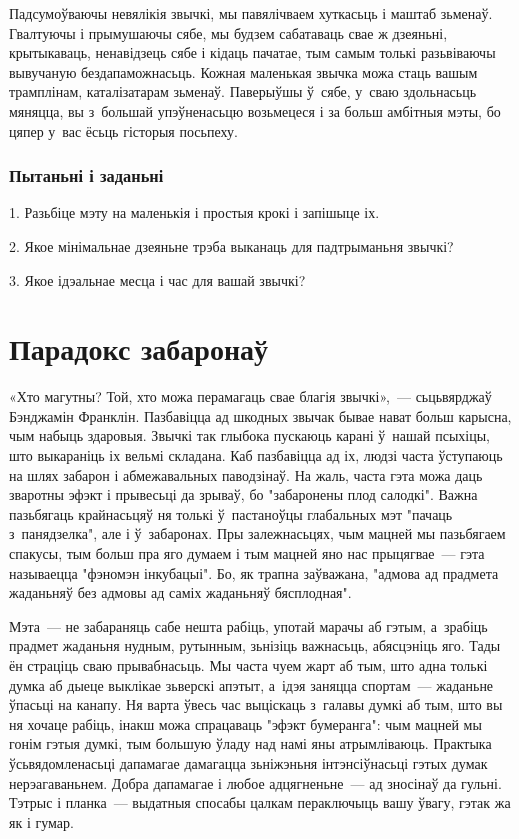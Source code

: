 Падсумоўваючы невялікія звычкі, мы павялічваем хуткасьць і маштаб зьменаў. Гвалтуючы і прымушаючы сябе, мы будзем сабатаваць свае ж дзеяньні, крытыкаваць, ненавідзець сябе і кідаць пачатае, тым самым толькі разьвіваючы вывучаную бездапаможнасьць. Кожная маленькая звычка можа стаць вашым трамплінам, каталізатарам зьменаў. Паверыўшы ў~сябе, у~сваю здольнасьць мяняцца, вы з~большай упэўненасьцю возьмецеся і за больш амбітныя мэты, бо цяпер у~вас ёсьць гісторыя посьпеху.

\subsubsection{Пытаньні і заданьні}

1. Разьбіце мэту на маленькія і простыя крокі і запішыце іх.

2. Якое мінімальнае дзеяньне трэба выканаць для падтрыманьня звычкі?

3. Якое ідэальнае месца і час для вашай звычкі?


\section{Парадокс забаронаў}

«Хто магутны? Той, хто можа перамагаць свае благія звычкі»,~--- сьцьвярджаў Бэнджамін Франклін. Пазбавіцца ад шкодных звычак бывае нават больш карысна, чым набыць здаровыя. Звычкі так глыбока пускаюць карані ў~нашай псыхіцы, што выкараніць іх вельмі складана. Каб пазбавіцца ад іх, людзі часта ўступаюць на шлях забарон і абмежавальных паводзінаў. На жаль, часта гэта можа даць зваротны эфэкт і прывесьці да зрываў, бо "забаронены плод салодкі". Важна пазьбягаць крайнасьцяў ня толькі ў~пастаноўцы глабальных мэт "пачаць з~панядзелка", але і ў~забаронах. Пры залежнасьцях, чым мацней мы пазьбягаем спакусы, тым больш пра яго думаем і тым мацней яно нас прыцягвае~--- гэта называецца "фэномэн інкубацыі". Бо, як трапна заўважана, "адмова ад прадмета жаданьняў без адмовы ад саміх жаданьняў бясплодная". 

Мэта~--- не забараняць сабе нешта рабіць, употай марачы аб гэтым, а~зрабіць прадмет жаданьня нудным, рутынным, зьнізіць важнасьць, абясцэніць яго. Тады ён страціць сваю прывабнасьць. Мы часта чуем жарт аб тым, што адна толькі думка аб дыеце выклікае зьверскі апэтыт, а~ідэя заняцца спортам~--- жаданьне ўпасьці на канапу. Ня варта ўвесь час выціскаць з~галавы думкі аб тым, што вы ня хочаце рабіць, інакш можа спрацаваць "эфэкт бумеранга": чым мацней мы гонім гэтыя думкі, тым большую ўладу над намі яны атрымліваюць. Практыка ўсьвядомленасьці дапамагае дамагацца зьніжэньня інтэнсіўнасьці гэтых думак нерэагаваньнем. Добра дапамагае і любое адцягненьне~--- ад зносінаў да гульні. Тэтрыс і планка~--- выдатныя спосабы цалкам пераключыць вашу ўвагу, гэтак жа як і гумар.

